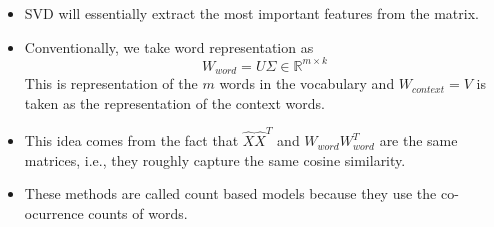 \documentclass[a4paper]{article}
\begin{document}
\begin{itemize}
    \item SVD will essentially extract the most important features from the matrix.
    \item Conventionally, we take word representation as
    \begin{equation*}
        W_{word}=U\Sigma \in \mathbb{R}^{m\times k}
    \end{equation*}
    This is representation of the $m$ words in the vocabulary and $W_{context}=V$ is taken as the representation of the context words.
    \item This idea comes from the fact that $\hat{X}\hat{X}^T$ and $W_{word}W_{word}^T$ are the same matrices, i.e., they roughly capture the same cosine similarity.
    \item These methods are called count based models because they use the co-ocurrence counts of words. 
\end{itemize}
\end{document}

